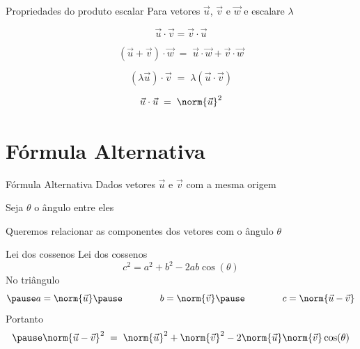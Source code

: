 \documentclass[fleqn,aspectratio=169,12pt]{beamer}
\begin{document}


\begin{frame}{Propriedades do produto escalar}
  Para vetores $\vec{u}$, $\vec{v}$ e $\vec{w}$ e escalare $\lambda$

  \pause
  \[
    \vec{u}\cdot\vec{v} = \vec{v}\cdot\vec{u}
  \]

  \pause
  \[
    (\vec{u}+\vec{v})\cdot\vec{w}
    \;=\; \vec{u}\cdot\vec{w} + \vec{v}\cdot\vec{w}
  \]

  \pause
  \[
    (\lambda\vec{u})\cdot\vec{v}
    \;=\; \lambda(\vec{u}\cdot\vec{v})
  \]

  \pause
  \[
    \vec{u}\cdot\vec{u}
    \;=\; \norm{\vec{u}}^2
  \]
\end{frame}

%

\section{Fórmula Alternativa}

\begin{frame}{Fórmula Alternativa}
  Dados vetores $\vec{u}$ e $\vec{v}$ com a mesma origem

  \pause
  \medskip
  Seja $\theta$ o ângulo entre eles

  \pause
  \medskip
  Queremos relacionar as componentes dos vetores com o ângulo $\theta$
\end{frame}


\begin{frame}{Lei dos cossenos}
  Lei dos cossenos
  \[
    c^2 = a^2 + b^2 - 2ab\cos(\theta)
  \]
  \pause
  No triângulo
  \[
    \pause
    a = \norm{\vec{u}}
    \pause\qquad\qquad
    b = \norm{\vec{v}}
    \pause\qquad\qquad
    c = \norm{\vec{u}-\vec{v}}
  \]
  \pause
  Portanto
  \[
    \pause
    \norm{\vec{u}-\vec{v}}^2
    \;=\; \norm{\vec{u}}^2 + \norm{\vec{v}}^2 - 2\norm{\vec{u}}\norm{\vec{v}}\cos(\theta)
  \]
\end{frame}
\end{document}
